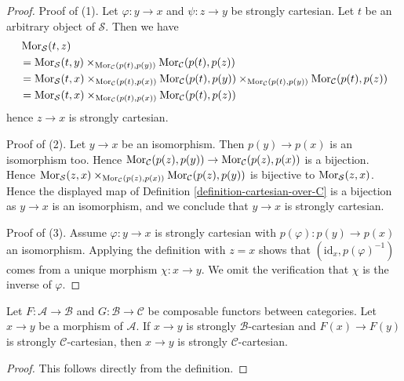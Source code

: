 \begin{proof}
Proof of (1). Let $\varphi : y \to x$ and $\psi : z \to y$ be
strongly cartesian. Let $t$ be an arbitrary object of $\mathcal{S}$.
Then we have
\begin{align*}
& \mathop{\mathrm{Mor}}\nolimits_\mathcal{S}(t, z) \\
& =
\mathop{\mathrm{Mor}}\nolimits_\mathcal{S}(t, y)
\times_{\mathop{\mathrm{Mor}}\nolimits_\mathcal{C}(p(t), p(y))}
\mathop{\mathrm{Mor}}\nolimits_\mathcal{C}(p(t), p(z)) \\
& =
\mathop{\mathrm{Mor}}\nolimits_\mathcal{S}(t, x)
\times_{\mathop{\mathrm{Mor}}\nolimits_\mathcal{C}(p(t), p(x))}
\mathop{\mathrm{Mor}}\nolimits_\mathcal{C}(p(t), p(y))
\times_{\mathop{\mathrm{Mor}}\nolimits_\mathcal{C}(p(t), p(y))}
\mathop{\mathrm{Mor}}\nolimits_\mathcal{C}(p(t), p(z)) \\
& =
\mathop{\mathrm{Mor}}\nolimits_\mathcal{S}(t, x)
\times_{\mathop{\mathrm{Mor}}\nolimits_\mathcal{C}(p(t), p(x))}
\mathop{\mathrm{Mor}}\nolimits_\mathcal{C}(p(t), p(z))
\end{align*}
hence $z \to x$ is strongly cartesian.

\medskip\noindent
Proof of (2). Let $y \to x$ be an isomorphism. Then $p(y) \to p(x)$
is an isomorphism too. Hence
$\mathop{\mathrm{Mor}}\nolimits_\mathcal{C}(p(z), p(y)) \to
\mathop{\mathrm{Mor}}\nolimits_\mathcal{C}(p(z), p(x))$
is a bijection. Hence
$\mathop{\mathrm{Mor}}\nolimits_\mathcal{S}(z, x)
\times_{\mathop{\mathrm{Mor}}\nolimits_\mathcal{C}(p(z), p(x))}
\mathop{\mathrm{Mor}}\nolimits_\mathcal{C}(p(z), p(y))$ is bijective to
$\mathop{\mathrm{Mor}}\nolimits_\mathcal{S}(z, x)$.
Hence the displayed map of
Definition \ref{definition-cartesian-over-C}
is a bijection as $y \to x$ is an isomorphism, and we conclude that
$y \to x$ is strongly cartesian.

\medskip\noindent
Proof of (3). Assume $\varphi : y \to x$ is strongly cartesian with
$p(\varphi) : p(y) \to p(x)$ an isomorphism. Applying the definition with
$z = x$ shows that $(\text{id}_x, p(\varphi)^{-1})$ comes from a unique
morphism $\chi : x \to y$. We omit the verification that $\chi$ is the
inverse of $\varphi$.
\end{proof}

\begin{lemma}
\label{lemma-cartesian-over-cartesian}
Let $F : \mathcal{A} \to \mathcal{B}$ and $G : \mathcal{B} \to \mathcal{C}$
be composable functors between categories. Let $x \to y$ be a morphism of
$\mathcal{A}$. If $x \to y$ is strongly $\mathcal{B}$-cartesian
and $F(x) \to F(y)$ is strongly $\mathcal{C}$-cartesian, then
$x \to y$ is strongly $\mathcal{C}$-cartesian.
\end{lemma}

\begin{proof}
This follows directly from the definition.
\end{proof}


